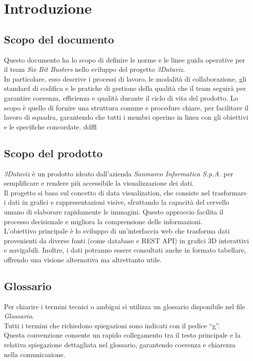 \section{Introduzione}
    \subsection{Scopo del documento}
    Questo documento ha lo scopo di definire le norme e le linee guida operative per il team \textit{Six Bit Busters} nello sviluppo del progetto \textit{3Dataviz}.\\ 
    In particolare, esso descrive i processi di lavoro, le modalità di collaborazione, gli standard di codifica e le pratiche di gestione della qualità che il team seguirà per garantire coerenza, efficienza e qualità durante il ciclo di vita del prodotto. 
    Lo scopo è quello di fornire una struttura comune e procedure chiare, per facilitare il lavoro di squadra, garantendo che tutti i membri operino in linea con gli obiettivi e le specifiche concordate.
ddffl
    \subsection{Scopo del prodotto}
    \textit{3Dataviz} è un prodotto ideato dall'azienda \textit{Sanmarco Informatica S.p.A.} per semplificare e rendere più accessibile la visualizzazione dei dati.\\
    Il progetto si basa sul concetto di data visualization, che consiste nel trasformare i dati in grafici e rappresentazioni visive, sfruttando la capacità del cervello umano di elaborare rapidamente le immagini. 
    Questo approccio facilita il processo decisionale e migliora la comprensione delle informazioni.\\
    L’obiettivo principale è lo sviluppo di un’interfaccia web che trasforma dati provenienti da diverse fonti (come database e REST API) in grafici 3D interattivi e navigabili. 
    Inoltre, i dati potranno essere consultati anche in formato tabellare, offrendo una visione alternativa ma altrettanto utile.  

    \subsection{Glossario}
    Per chiarire i termini tecnici o ambigui si utilizza un glossario disponibile nel file \textit{Glossario}.\\
    Tutti i termini che richiedono spiegazioni sono indicati con il pedice “g”. \\
    Questa convenzione consente un rapido collegamento tra il testo principale e la relativa spiegazione dettagliata nel glossario, garantendo coerenza e chiarezza nella comunicazione.


